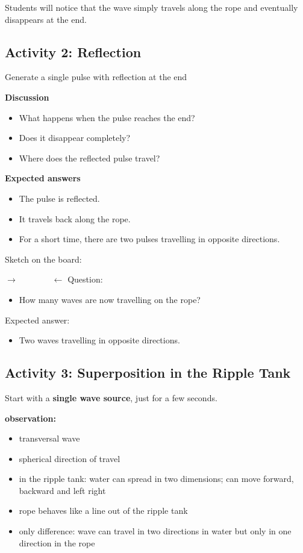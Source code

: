 \documentclass[a4paper,11pt]{article}
\begin{document}
Students will notice that the wave simply travels along the rope and eventually disappears at the end.

\vspace{0.5em}
\subsection*{Activity 2: Reflection}

Generate a single pulse with reflection at the end 

\textbf{Discussion}
\begin{itemize}
    \item What happens when the pulse reaches the end?
    \item Does it disappear completely?
    \item Where does the reflected pulse travel?
\end{itemize}

\textbf{Expected answers}
\begin{itemize}
    \item The pulse is reflected.
    \item It travels back along the rope.
    \item For a short time, there are two pulses travelling in opposite directions.
\end{itemize}

Sketch on the board: 

$
\rightarrow \qquad\qquad \leftarrow
$
Question: 

\begin{itemize}
    \item How many waves are now travelling on the rope?
\end{itemize}

Expected answer:

\begin{itemize}
    \item Two waves travelling in opposite directions.
\end{itemize}


\subsection*{Activity 3: Superposition in the Ripple Tank}

Start with a  \textbf{single wave source}, just for a few seconds. 

\textbf{observation:}
\begin{itemize}
    \item transversal wave 
    \item spherical direction of travel 
    \item in the ripple tank: water can spread in two dimensions; can move forward, backward and left right 
    \item rope behaves like a line out of the ripple tank 
    \item only difference: wave can travel in two directions in water but only in one direction in the rope
\end{itemize}
\end{document}
